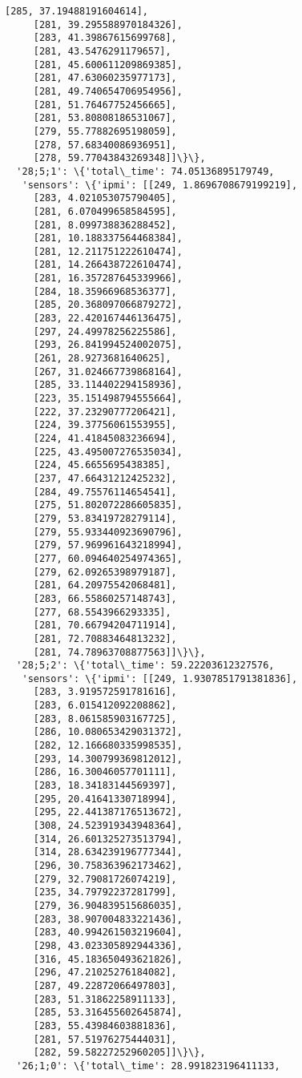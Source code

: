 \documentclass[11pt]{article}
\begin{document}
\begin{tcolorbox}[breakable, size=fbox, boxrule=.5pt, pad at break*=1mm, opacityfill=0]
\begin{Verbatim}[commandchars=\\\{\}]
     [285, 37.19488191604614],
     [281, 39.295588970184326],
     [283, 41.39867615699768],
     [281, 43.5476291179657],
     [281, 45.600611209869385],
     [281, 47.63060235977173],
     [281, 49.740654706954956],
     [281, 51.76467752456665],
     [281, 53.80808186531067],
     [279, 55.77882695198059],
     [278, 57.68340086936951],
     [278, 59.77043843269348]]\}\},
  '28;5;1': \{'total\_time': 74.05136895179749,
   'sensors': \{'ipmi': [[249, 1.8696708679199219],
     [283, 4.021053075790405],
     [281, 6.070499658584595],
     [281, 8.099738836288452],
     [281, 10.188337564468384],
     [281, 12.211751222610474],
     [281, 14.266438722610474],
     [281, 16.357287645339966],
     [284, 18.35966968536377],
     [285, 20.368097066879272],
     [283, 22.420167446136475],
     [297, 24.49978256225586],
     [293, 26.841994524002075],
     [261, 28.9273681640625],
     [267, 31.024667739868164],
     [285, 33.114402294158936],
     [223, 35.151498794555664],
     [222, 37.23290777206421],
     [224, 39.37756061553955],
     [224, 41.41845083236694],
     [225, 43.495007276535034],
     [224, 45.6655695438385],
     [237, 47.66431212425232],
     [284, 49.75576114654541],
     [275, 51.802072286605835],
     [279, 53.83419728279114],
     [279, 55.933440923690796],
     [279, 57.969961643218994],
     [277, 60.094640254974365],
     [279, 62.09265398979187],
     [281, 64.20975542068481],
     [283, 66.55860257148743],
     [277, 68.5543966293335],
     [281, 70.66794204711914],
     [281, 72.70883464813232],
     [281, 74.78963708877563]]\}\},
  '28;5;2': \{'total\_time': 59.22203612327576,
   'sensors': \{'ipmi': [[249, 1.9307851791381836],
     [283, 3.919572591781616],
     [283, 6.015412092208862],
     [283, 8.061585903167725],
     [286, 10.080653429031372],
     [282, 12.166680335998535],
     [293, 14.300799369812012],
     [286, 16.30046057701111],
     [283, 18.34183144569397],
     [295, 20.41641330718994],
     [295, 22.441387176513672],
     [308, 24.523919343948364],
     [314, 26.601325273513794],
     [314, 28.634239196777344],
     [296, 30.758363962173462],
     [279, 32.79081726074219],
     [235, 34.79792237281799],
     [279, 36.904839515686035],
     [283, 38.907004833221436],
     [283, 40.994261503219604],
     [298, 43.023305892944336],
     [316, 45.183650493621826],
     [296, 47.21025276184082],
     [287, 49.22872066497803],
     [283, 51.31862258911133],
     [285, 53.316455602645874],
     [283, 55.43984603881836],
     [281, 57.51976275444031],
     [282, 59.58227252960205]]\}\},
  '26;1;0': \{'total\_time': 28.991823196411133,

\end{Verbatim}
\end{tcolorbox}
\end{document}
